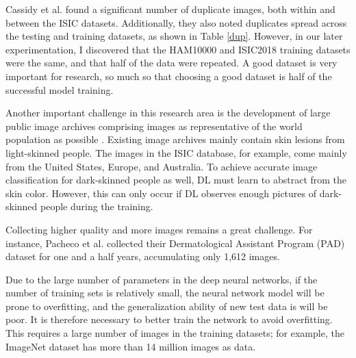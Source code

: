 Cassidy et al. \cite{cassidy2022analysis} found a significant number of duplicate images, both within and between the ISIC datasets. Additionally, they also noted duplicates spread across the testing and training datasets, as shown in Table \ref{dup}. However, in our later experimentation, I discovered that the HAM10000 and ISIC2018 training datasets were the same, and that half of the data were repeated. A good dataset is very important for research, so much so that choosing a good dataset is half of the successful model training.

\begin{table}[!htbp]
\centering
\caption{Number of image files deleted from each ISIC training set after applying our duplicate removal strategy. \cite{cassidy2022analysis}.}\label{dup}
\end{table}

Another important challenge in this research area is the development of large public image archives comprising images as representative of the world population as possible \cite{navarrete2018automated}. Existing image archives mainly contain skin lesions from light-skinned people. The images in the ISIC database, for example, come mainly from the United States, Europe, and Australia. To achieve accurate image classification for dark-skinned people as well, DL must learn to abstract from the skin color. However, this can only occur if DL observes enough pictures of dark-skinned people during the training.

Collecting higher quality and more images remains a great challenge. For instance,  Pacheco et al. \cite{pacheco2020impact} collected their Dermatological Assistant Program (PAD) dataset for one and a half years, accumulating only 1,612 images.

Due to the large number of parameters in the deep neural networks, if the number of training sets is relatively small, the neural network model will be prone to overfitting, and the generalization ability of new test data is will be poor. It is therefore necessary to better train the network to avoid overfitting. This requires a large number of images in the training datasets; for example, the ImageNet dataset has more than 14 million images as data.

